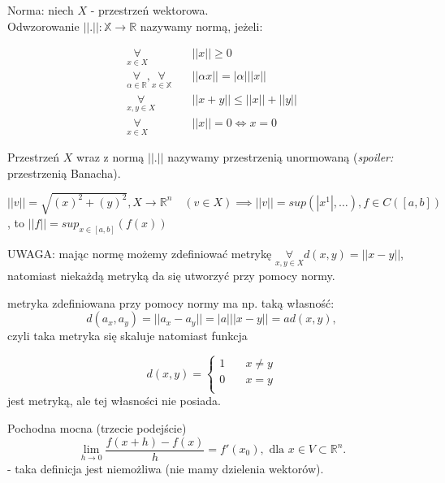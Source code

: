 \documentclass[../main.tex]{subfiles}
\begin{document}
\begin{definicja}
Norma: niech $X$ - przestrzeń wektorowa.\\
Odwzorowanie $||.||: \mathbb{X}\to \mathbb{R}$ nazywamy normą, jeżeli:
\end{definicja}

\begin{align}
    \underset{x\in X}{\forall} \quad &||x|| \geq 0\\
    \underset{\alpha\in\mathbb{R}}{\forall}, \underset{x\in \mathbb{X}}{\forall} \quad &|| \alpha x|| = |\alpha| ||x||\\
    \underset{x,y \in X}{\forall} \quad &||x+y|| \leq ||x|| + ||y||\\
    \underset{x\in X}{\forall} \quad &||x|| = 0 \iff x = 0
\end{align}

Przestrzeń $X$ wraz z normą $||.||$ nazywamy przestrzenią unormowaną (\textit{spoiler:} przestrzenią Banacha).

\begin{przyklad}
\end{przyklad}

$||v|| = \sqrt{(x)^2 + (y)^2}, X \to \mathbb{R}^{n} \quad (v\in X)\implies||v|| = sup(|x^1|,\dots), f\in C([a,b])$, to $||f|| = sup_{x\in{[a,b]}} (f(x))$

\vspace{0.3cm}
UWAGA: mając normę możemy zdefiniować metrykę $\underset{x,y\in X}{\forall} d(x,y) = ||x-y||$, natomiast niekażdą metryką da się utworzyć przy pomocy normy.
\vspace{0.3cm}

\begin{przyklad}
    metryka zdefiniowana przy pomocy normy ma np. taką własność: $$d(a_x,a_y) = ||a_x - a_y|| = |a| ||x-y|| = a d(x,y),$$ czyli taka metryka się skaluje natomiast funkcja
\end{przyklad}

\[ d(x,y) =
\begin{cases}
    1 & \quad x\neq y\\
    0 & \quad x=y\\
\end{cases}
\]  jest metryką, ale tej własności nie posiada.

\begin{definicja}
    Pochodna mocna (trzecie podejście)
\[
 \lim\limits_{h \to 0}\frac{f(x+h) - f(x)}{h} = f'(x_0), \text{ dla }x\in V\subset \mathbb{R}^{n}
 .\]
 - taka definicja jest niemożliwa (nie mamy dzielenia wektorów).
\end{definicja}
\end{document}
